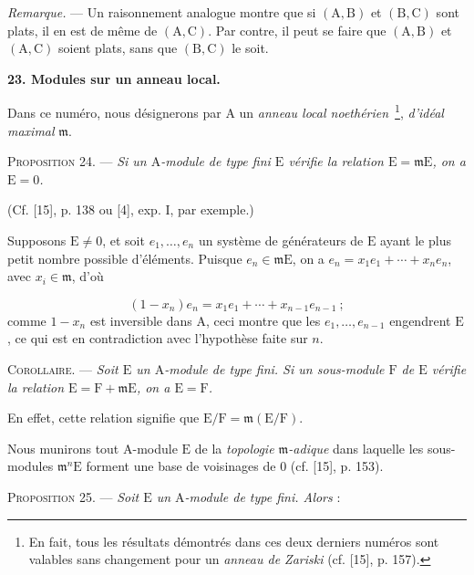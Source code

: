 \emph{Remarque.} --- Un raisonnement analogue montre que si $(\mathrm{A}, \mathrm{B})$ et $(\mathrm{B}, \mathrm{C})$ sont plats, il en est de même de $(\mathrm{A}, \mathrm{C})$. Par contre, il peut se faire que $(\mathrm{A}, \mathrm{B})$ et $(\mathrm{A}, \mathrm{C})$ soient plats, sans que $(\mathrm{B}, \mathrm{C})$ le soit.


\textbf{23. Modules sur un anneau local.}

Dans ce numéro, nous désignerons par $\mathrm{A}$ un \emph{anneau local noethérien}\ \footnote{En fait, tous les résultats démontrés dans ces deux derniers numéros sont valables sans changement pour un \emph{anneau de Zariski} (cf. [15], p. 157).}, \emph{d'idéal maximal} $\mathfrak{m}$.

\textsc{Proposition 24}. --- \emph{Si un $\mathrm{A}$-module de type fini $\mathrm{E}$ vérifie la relation $\mathrm{E} = \mathfrak{m}\mathrm{E}$, on a $\mathrm{E} = 0$.}

(Cf. [15], p. 138 ou [4], exp. I, par exemple.)

Supposons $\mathrm{E} \neq 0$, et soit $e_1, \ldots, e_n$ un système de générateurs %
de $\mathrm{E}$ ayant le plus petit nombre possible d'éléments. Puisque $e_n \in \mathfrak{m}\mathrm{E}$, on a $e_n = x_1 e_1 + \cdots + x_n e_n$, avec $x_i \in \mathfrak{m}$, d'où

\begin{equation*}
(1 - x_n) e_n = x_1 e_1 + \cdots + x_{n-1} e_{n-1} \ ;
\end{equation*}
comme $1 - x_n$ est inversible dans $\mathrm{A}$, ceci montre que les $e_1, \ldots, e_{n-1}$ engendrent $\mathrm{E}$, ce qui est en contradiction avec l'hypothèse faite sur $n$.

\textsc{Corollaire}. --- \emph{Soit $\mathrm{E}$ un $\mathrm{A}$-module de type fini. Si un sous-module $\mathrm{F}$ de $\mathrm{E}$ vérifie la relation $\mathrm{E} = \mathrm{F} + \mathfrak{m}\mathrm{E}$, on a $\mathrm{E} = \mathrm{F}$.}

En effet, cette relation signifie que $\mathrm{E}/\mathrm{F} = \mathfrak{m}(\mathrm{E}/\mathrm{F})$.

Nous munirons tout $\mathrm{A}$-module $\mathrm{E}$ de la \emph{topologie $\mathfrak{m}$-adique} dans laquelle les sous-modules $\mathfrak{m}^n \mathrm{E}$ forment une base de voisinages de $0$ (cf. [15], p. 153).

\textsc{Proposition 25}. --- \emph{Soit $\mathrm{E}$ un $\mathrm{A}$-module de type fini. Alors} :

